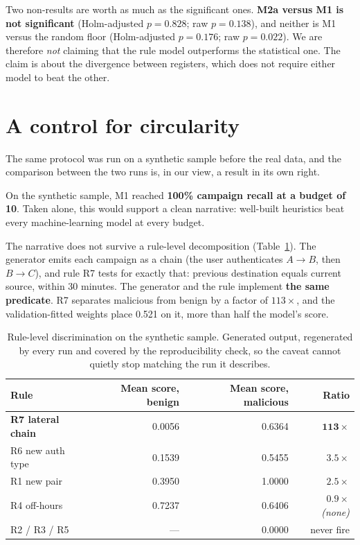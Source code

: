 \documentclass[11pt,a4paper]{article}
\begin{document}
Two non-results are worth as much as the significant ones. \textbf{M2a versus M1
is not significant} (Holm-adjusted $p = 0.828$; raw $p = 0.138$), and neither is
M1 versus the random floor (Holm-adjusted $p = 0.176$; raw $p = 0.022$). We are
therefore \emph{not} claiming that the rule model outperforms the statistical
one. The claim is about the divergence between registers, which does not require
either model to beat the other.

\section{A control for circularity}
\label{sec:circularity}

The same protocol was run on a synthetic sample before the real data, and the
comparison between the two runs is, in our view, a result in its own right.

On the synthetic sample, M1 reached \textbf{100\% campaign recall at a budget of
10}. Taken alone, this would support a clean narrative: well-built heuristics beat
every machine-learning model at every budget.

The narrative does not survive a rule-level decomposition
(Table~\ref{tab:rules}). The generator emits each campaign as a chain (the
user authenticates $A \to B$, then $B \to C$), and rule R7 tests for exactly
that: previous destination equals current source, within 30 minutes. The
generator and the rule implement \textbf{the same predicate}. R7 separates
malicious from benign by a factor of $113\times$, and the validation-fitted
weights place 0.521 on it, more than half the model's score.

\begin{table}[t]
\centering
\begin{tabular}{lrrr}
\toprule
Rule & Mean score, benign & Mean score, malicious & Ratio \\
\midrule
\textbf{R7 lateral chain} & 0.0056 & 0.6364 & $\mathbf{113\times}$ \\
R6 new auth type          & 0.1539 & 0.5455 & $3.5\times$ \\
R1 new pair               & 0.3950 & 1.0000 & $2.5\times$ \\
R4 off-hours              & 0.7237 & 0.6406 & $0.9\times$ \emph{(none)} \\
R2 / R3 / R5              & ---    & 0.0000 & never fire \\
\bottomrule
\end{tabular}
\caption{Rule-level discrimination on the synthetic sample. Generated output,
regenerated by every run and covered by the reproducibility check, so the caveat
cannot quietly stop matching the run it describes.}
\label{tab:rules}
\end{table}
\end{document}
